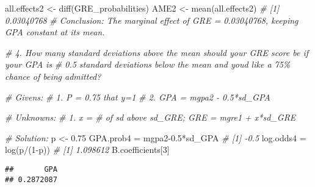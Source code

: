 \documentclass[
]{article}
\newenvironment{Shaded}{\begin{snugshade}}{\end{snugshade}}
\newcommand{\CommentTok}[1]{\textcolor[rgb]{0.56,0.35,0.01}{\textit{#1}}}
\newcommand{\DecValTok}[1]{\textcolor[rgb]{0.00,0.00,0.81}{#1}}
\newcommand{\FloatTok}[1]{\textcolor[rgb]{0.00,0.00,0.81}{#1}}
\newcommand{\FunctionTok}[1]{\textcolor[rgb]{0.00,0.00,0.00}{#1}}
\newcommand{\NormalTok}[1]{#1}
\newcommand{\OtherTok}[1]{\textcolor[rgb]{0.56,0.35,0.01}{#1}}
\newcommand{\SpecialCharTok}[1]{\textcolor[rgb]{0.00,0.00,0.00}{#1}}
\begin{document}
\begin{Shaded}
\begin{Highlighting}[]
\NormalTok{all.effects2 }\OtherTok{\textless{}{-}} \FunctionTok{diff}\NormalTok{(GRE\_probabilities)}
\NormalTok{AME2 }\OtherTok{\textless{}{-}} \FunctionTok{mean}\NormalTok{(all.effects2)  }\CommentTok{\# [1] 0.03040768}
\CommentTok{\# Conclusion: The marginal effect of GRE = 0.03040768, keeping GPA constant at its mean.  }




\CommentTok{\# 4.    How many standard deviations above the mean should your GRE score be if your GPA is}
\CommentTok{\#     0.5 standard deviations below the mean and you\textquotesingle{}d like a 75\% chance of being admitted? }
\end{Highlighting}
\end{Shaded}

\begin{Shaded}
\begin{Highlighting}[]
\CommentTok{\# Givens: }
\CommentTok{\# 1. P = 0.75 that y=1}
\CommentTok{\# 2. GPA = mgpa2 {-} 0.5*sd\_GPA}

\CommentTok{\# Unknowns:}
\CommentTok{\# 1. x = \# of sd above sd\_GRE; GRE = mgre1 + x*sd\_GRE}

\CommentTok{\# Solution:}
\NormalTok{p }\OtherTok{\textless{}{-}} \FloatTok{0.75}
\NormalTok{GPA.prob4 }\OtherTok{=}\NormalTok{ mgpa2}\FloatTok{{-}0.5}\SpecialCharTok{*}\NormalTok{sd\_GPA  }\CommentTok{\# [1] {-}0.5 }
\NormalTok{log.odds4 }\OtherTok{=} \FunctionTok{log}\NormalTok{(p}\SpecialCharTok{/}\NormalTok{(}\DecValTok{1}\SpecialCharTok{{-}}\NormalTok{p))      }\CommentTok{\# [1] 1.098612}
\NormalTok{B.coefficients[}\DecValTok{3}\NormalTok{]}
\end{Highlighting}
\end{Shaded}

\begin{verbatim}
##       GPA 
## 0.2872087
\end{verbatim}
\end{document}
